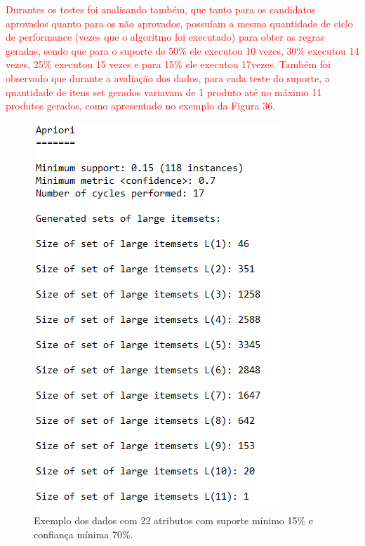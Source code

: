 \par
\textcolor{red}{Durantes os testes foi analisando também, que tanto para os candidatos aprovados quanto para os não aprovados, possuíam a mesma quantidade de ciclo de performance (vezes que o algoritmo foi executado) para obter as regras geradas, sendo que para o suporte de 50\% ele executou 10 vezes, 30\% executou 14 vezes, 25\% executou 15 vezes e para 15\% ele executou 17vezes. Também foi observado que durante a avaliação dos dados, para cada teste do suporte, a quantidade de itens set gerados variavam de 1 produto até no máximo 11 produtos gerados, como apresentado no exemplo da Figura 36.}


\par
\begin{figure}[!htp]
	\begin{center}
    \caption{\label{fig:waveform_fig} Exemplo dos dados com 22 atributos com suporte mínimo 15\% e confiança mínima 70\%.}
	\includegraphics[scale=0.90]{Figuras/Resultados_valores_apriori.png}
	\end{center}
\end{figure}

\par
\textcolor{red}{}